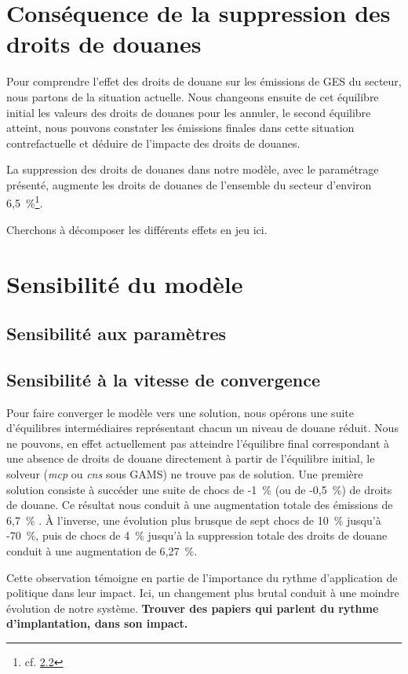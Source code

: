 \section{Conséquence de la suppression des droits de douanes}

Pour comprendre l'effet des droits de douane sur les émissions de GES du secteur, nous partons de la situation actuelle. Nous changeons ensuite de cet équilibre initial les valeurs des droits de douanes pour les annuler, le second équilibre atteint, nous pouvons constater les émissions finales dans cette situation contrefactuelle et déduire de l'impacte des droits de douanes.

La suppression des droits de douanes dans notre modèle, avec le paramétrage présenté, augmente les droits de douanes de l'ensemble du secteur d'environ 6,5~\%\footnote{cf. \ref{subsec:vit_cvg}}.

Cherchons à décomposer les différents effets en jeu ici.


\section{Sensibilité du modèle}

\subsection{Sensibilité aux paramètres}

\subsection{Sensibilité à la vitesse de convergence}\label{subsec:vit_cvg}

Pour faire converger le modèle vers une solution, nous opérons une suite d'équilibres intermédiaires représentant chacun un niveau de douane réduit. Nous ne pouvons, en effet actuellement pas atteindre l'équilibre final correspondant à une absence de droits de douane directement à partir de l'équilibre initial, le solveur (\textit{mcp} ou \textit{cns} sous GAMS) ne trouve pas de solution. Une première solution consiste à succéder une suite de chocs de -1~\% (ou de -0,5~\%) de droits de douane. Ce résultat nous conduit à une augmentation totale des émissions de 6,7~\% . À l'inverse, une évolution plus brusque de sept chocs de 10~\% jusqu'à -70~\%, puis de chocs de 4~\% jusqu'à la suppression totale des droits de douane conduit à une augmentation de 6,27~\%.

Cette observation témoigne en partie de l'importance du rythme d'application de politique dans leur impact. Ici, un changement plus brutal conduit à une moindre évolution de notre système. \textbf{Trouver des papiers qui parlent du rythme d'implantation, dans son impact.}